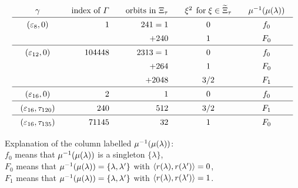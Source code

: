 \documentclass{amsart} %
\begin{document}
\begin{table}
\[
\setlength{\arraycolsep}{10pt}
\renewcommand{\arraystretch}{1.4}
\begin{array}{crrcc}
\gamma &\textrm{index of $\vGam$} &\textrm{orbits in $\Xitau$} & \xi^2\textrm{\;\,for\;} \xi\in \tilXitau&\mu\inv(\mu(\lambda))\\
\hline 
(\vep_8, 0) &1 & 241= 1 & 0 & f_0 \\
  & & +240 & 1 & F_0 \\
\hline 
(\vep_{12}, 0) &104448 & 2313= 1 & 0 & f_0 \\
  & & +264 & 1 & F_0 \\
  & & +2048 & 3/2 & F_1 \\
 \hline 
(\vep_{16}, 0) &2& 1 & 0 & f_0 \\
\hline 
(\vep_{16},\tauI) &240& 512 & 3/2 & F_1 \\
\hline 
(\vep_{16},\tauII) &71145 & 32 & 1 & F_0 \\  
\end{array}
\]
\vskip 3mm
%
\parbox{12cm}{
Explanation of the column labelled   $\mu^{-1}(\mu(\lambda))$: \\
$f_0$ means that $\mu^{-1}(\mu(\lambda))$ is a singleton $\{\lambda\}$,
\\
$ F_0$ means that $\mu^{-1}(\mu(\lambda))=\{\lambda, \lambda^{\prime}\}$ with $\langle r(\lambda), r(\lambda^{\prime}) \rangle=0$, 
\\
$ F_1$ means that $\mu^{-1}(\mu(\lambda))=\{\lambda, \lambda^{\prime}\}$ with $\langle r(\lambda), r(\lambda^{\prime}) \rangle=1$.
}
%
%
\vskip 5mm
\caption{Index $[\OG(\Lplus, \PPPplus): \vGam]$ and orbit decomposition of walls}\label{table:Xis}
\end{table}
%
\end{document}
